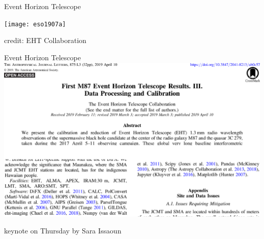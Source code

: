 \documentclass[svgnames]{beamer}
\begin{document}
\begin{frame}

 \vspace{3.5truecm}
 \begin{center}
  \\[0.4truecm]

  \vspace{2truecm}
  \faGithub\ 
 \end{center}
\end{frame}

\begin{frame}{Event Horizon Telescope}

 \vspace{0.3truecm}
 \texttt{[image: eso1907a]}

 \vspace{-0.4truecm}
 \begin{flushright}
  \footnotesize credit: EHT Collaboration
 \end{flushright}
\end{frame}

\begin{frame}{Event Horizon Telescope}
 \includegraphics[width=\textwidth]{eht2019}

 \begin{center}
  \large {}\quad keynote on Thursday by Sara Issaoun
 \end{center}
\end{frame}
\end{document}
